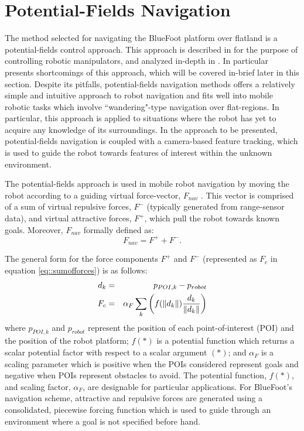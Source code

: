 	\section{Potential-Fields Navigation}

		The method selected for navigating the BlueFoot platform over flatland is a potential-fields control approach. This approach is described in \cite{Hogan1984} for the purpose of controlling robotic manipulators, and analyzed in-depth in \cite{Koren1991}. In particular \cite{Koren1991} presents shortcomings of this approach, which will be covered in-brief later in this section. Despite its pitfalls, potential-fields navigation methods offers a relatively simple and intuitive approach to robot navigation and fits well into mobile robotic tasks which involve ``wandering"-type navigation over flat-regions. In particular, this approach is applied to situations where the robot has yet to acquire any knowledge of its surroundings. In the approach to be presented, potential-fields navigation is coupled with a camera-based feature tracking, which is used to guide the robot towards features of interest within the unknown environment.

		The potential-fields approach is used in mobile robot navigation by moving the robot according to a guiding virtual force-vector, $F_{nav}$ \cite{Koren1991,ArambulaCosio2004}. This vector is comprised of a sum of virtual repulsive forces, $F^{-}$ (typically generated from range-sensor data), and virtual attractive forces, $F^{+}$, which pull the robot towards known goals. Moreover, $F_{nav}$ formally defined as:
		\begin{equation}
			F_{nav} = F^{+} + F^{-}.
			\label{eq::sumofforces}
		\end{equation}

		The general form for the force components $F^{+}$ and $F^{-}$ (represented as $F_{c}$ in equation \ref{eq::sumofforces}) is as follows:
		\begin{eqnarray}
			d_{k} 	&=& p_{POI,k} - p_{robot} \nonumber\\
			F_{c}	&=& \alpha_{F}\sum_{k}\left( f(\left\lVert d_{k}\right\rVert)\frac{d_{k}}{\left\lVert d_{k}\right\rVert} \right)
			\label{eq::sumofforces}
		\end{eqnarray}	
		where $p_{POI,k}$ and $p_{robot}$ represent the position of each \Kth point-of-interest (POI) and the position of the robot platform; $f(*)$ is a potential function which returns a scalar potential factor with respect to a scalar argument $(*)$; and $\alpha_{F}$ is a scaling parameter which is positive when the POIs considered represent goals and negative when POIs represent obstacles to avoid. The potential function, $f(*)$, and scaling factor, $\alpha_{F}$, are designable for particular applications. For BlueFoot's navigation scheme, attractive and repulsive forces are generated using a consolidated, piecewise forcing function which is used to guide through an environment where a goal is not specified before hand. 

